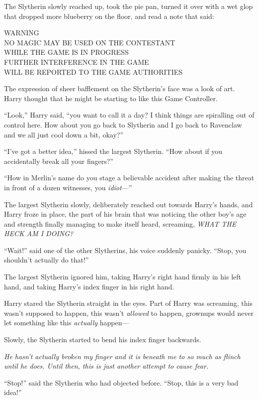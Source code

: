 The Slytherin slowly reached up, took the pie pan, turned it over with a
wet glop that dropped more blueberry on the floor, and read a note that
said:

WARNING\\NO MAGIC MAY BE USED ON THE CONTESTANT\\WHILE THE GAME IS IN
PROGRESS\\FURTHER INTERFERENCE IN THE GAME\\WILL BE REPORTED TO THE GAME
AUTHORITIES

The expression of sheer bafflement on the Slytherin's face was a look of
art. Harry thought that he might be starting to like this Game
Controller.

``Look,'' Harry said, ``you want to call it a day? I think things are
spiralling out of control here. How about you go back to Slytherin and I
go back to Ravenclaw and we all just cool down a bit, okay?''

``I've got a better idea,'' hissed the largest Slytherin. ``How about if
you accidentally break all your fingers?''

``How in Merlin's name do you stage a believable accident after making
the threat in front of a dozen witnesses, you \emph{idiot}---''

The largest Slytherin slowly, deliberately reached out towards Harry's
hands, and Harry froze in place, the part of his brain that was noticing
the other boy's age and strength finally managing to make itself heard,
screaming, \emph{WHAT THE HECK AM I DOING?}

``Wait!'' said one of the other Slytherins, his voice suddenly panicky.
``Stop, you shouldn't actually do that!''

The largest Slytherin ignored him, taking Harry's right hand firmly in
his left hand, and taking Harry's index finger in his right hand.

Harry stared the Slytherin straight in the eyes. Part of Harry was
screaming, this wasn't supposed to happen, this wasn't \emph{allowed} to
happen, grownups would never let something like this \emph{actually}
happen---

Slowly, the Slytherin started to bend his index finger backwards.

\emph{He hasn't actually broken my finger and it is beneath me to so
much as flinch until he does. Until then, this is just another attempt
to cause fear.}

``Stop!'' said the Slytherin who had objected before. ``Stop, this is a
very bad idea!''

